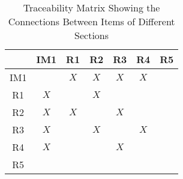 \documentclass[12pt]{article}
\newcommand{\dref}[1]{GD\ref{#1}}
\newcommand{\ddref}[1]{DD\ref{#1}}
\newcommand{\tref}[1]{TM\ref{#1}}
\newcommand{\iref}[1]{IM\ref{#1}}
\begin{document}
\begin{table}[h!]
\centering
\begin{tabular}{|c|c|c|c|c|c|c|}
\hline & IM1 & R1 & R2 & R3 & R4 & R5 \\
\hline IM1 & & $X$ & $X$ & $X$ & $X$ & \\
\hline R1 & $X$ & & $X$ & & & \\
\hline R2 & $X$ & $X$ & & $X$ & & \\
\hline R3 & $X$ & & $X$ & & $X$ & \\
\hline R4 & $X$ & & & $X$ & & \\
\hline R5 & & & & & & \\
\hline
\end{tabular}
\caption{Traceability Matrix Showing the Connections Between Items of Different Sections}
\label{Table:trace}
\end{table}
\end{document}
